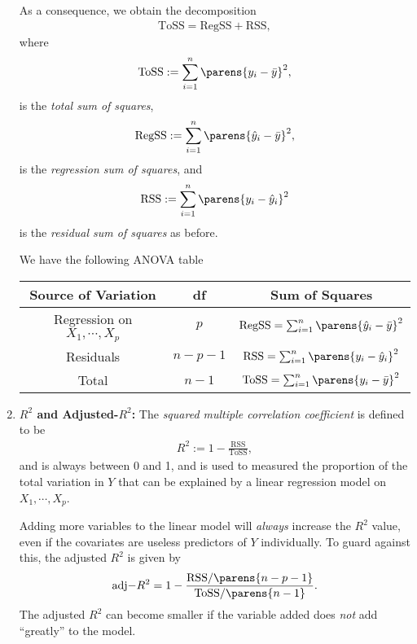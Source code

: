 \documentclass[12pt]{article}
\begin{document}
\begin{enumerate}[label=\textbf{\arabic*.}]
	As a consequence, we obtain the decomposition 
	\begin{align*}
		\mathrm{ToSS} = \mathrm{RegSS} + \mathrm{RSS}, 
	\end{align*}
	where
	\begin{align*}
		\mathrm{ToSS} := \sum_{i=1}^n \parens{y_i - \bar{y}}^2, 
	\end{align*}
	is the \emph{total sum of squares}, 
	\begin{align*}
		\mathrm{RegSS} := \sum_{i=1}^n \parens{\hat{y}_i - \bar{y}}^2, 
	\end{align*}
	is the \emph{regression sum of squares}, and 
	\begin{align*}
		\mathrm{RSS} := \sum_{i=1}^n \parens{y_i - \hat{y}_i}^2
	\end{align*}
	is the \emph{residual sum of squares} as before. 
	
	We have the following ANOVA table 
	
	\begin{center}
		\begin{tabular}{*{3}{c}}
			\toprule 
			Source of Variation & df & Sum of Squares \\
			\midrule
			Regression on $X_1, \cdots, X_p$ & $p$ &  $\mathrm{RegSS} = \sum_{i=1}^n \parens{\hat{y}_i - \bar{y}}^2$ \\ 
			Residuals & $n - p - 1$ & $\mathrm{RSS} = \sum_{i=1}^n \parens{y_i - \hat{y}_i}^2$ \\ 
			\midrule 
			Total & $n-1$ & $\mathrm{ToSS} = \sum_{i=1}^n \parens{y_i - \bar{y}}^2$ \\
			\bottomrule
		\end{tabular}
	\end{center}
	
	\item \textbf{$R^2$ and Adjusted-$R^2$:} The \emph{squared multiple correlation coefficient} is defined to be 
	\begin{align*}
		R^2 := 1 - \frac{\mathrm{RSS}}{\mathrm{ToSS}}, 
	\end{align*}
	and is always between 0 and 1, and is used to measured the proportion of the total variation in $Y$ that can be explained by a linear regression model on $X_1, \cdots, X_p$. 
	
	Adding more variables to the linear model will \emph{always} increase the $R^2$ value, even if the covariates are useless predictors of $Y$ individually. To guard against this, the adjusted $R^2$ is given by 
	\begin{align*}
		\mathrm{adj-}R^2 = 1 - \frac{\mathrm{RSS} / \parens{n-p-1}}{\mathrm{ToSS} / \parens{n-1}}. 
	\end{align*}
	The adjusted $R^2$ can become smaller if the variable added does \emph{not} add ``greatly'' to the model. 
	

\end{enumerate}
\end{document}
